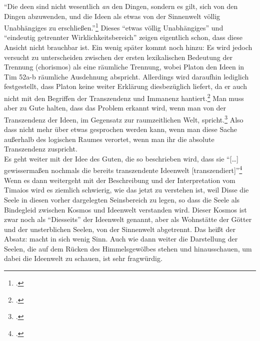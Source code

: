 \enquote{Die deen sind nicht wesentlich \emph{an} den Dingen, sondern es gilt, sich von den Dingen abzuwenden, und die Ideen als etwas von der Sinnenwelt völlig Unabhängiges zu erschließen.}\footcite[][S. 32]{DisseMetaphysik}
Dieses \enquote{etwas völlig Unabhängiges} und \enquote{eindeutig getrennter Wirklichkeitsbereich} zeigen eigentlich schon, dass diese Ansicht nicht brauchbar ist.
Ein wenig später kommt noch hinzu: 
Es wird jedoch versucht zu unterscheiden zwischen der ersten lexikalischen Bedeutung der Trennung (chorismos) als eine räumliche Trennung, wobei Platon den Ideen in Tim 52a-b räumliche Ausdehnung abspricht. Allerdings wird daraufhin lediglich festgestellt, dass Platon keine weiter Erklärung diesbezüglich liefert, da er auch nicht mit den Begriffen der Transzendenz und Immanenz hantiert.\footcite[vgl.][S. 34f]{DisseMetaphysik} Man muss aber zu Gute halten, dass das Problem erkannt wird, wenn man von der Transzendenz der Ideen, im Gegensatz zur raumzeitlichen Welt, spricht.\footcite[vgl.][S. 35]{DisseMetaphysik} Also dass nicht mehr über etwas gesprochen werden kann, wenn man diese Sache außerhalb des logischen Raumes verortet, wenn man ihr die absolute Transzendenz zuspricht.\\
Es geht weiter mit der Idee des Guten, die so beschrieben wird, dass sie \enquote{[\dots] gewissermaßen nochmals die bereits transzendente Ideenwelt [transzendiert]}\footcite[vgl.][S. 50]{DisseMetaphysik}
Wenn es dann weitergeht mit der Beschreibung und der Interpretation vom Timaios wird es ziemlich schwierig, wie das jetzt zu verstehen ist, weil Disse die Seele in diesen vorher dargelegten Seinsbereich zu legen, so dass die Seele als Bindegleid zwischen Kosmos und Ideenwelt verstanden wird. Dieser Kosmos ist zwar noch als \enquote{Diesseits} der Ideenwelt genannt, aber als Wohnstätte der Götter und der unsterblichen Seelen, von der Sinnenwelt abgetrennt. Das heißt der Absatz:  macht in sich wenig Sinn. Auch wie dann weiter die Darstellung der Seelen, die auf dem Rücken des Himmelsgewölbes stehen und hinausschauen, um dabei die Ideenwelt zu schauen, ist sehr fragwürdig. 

